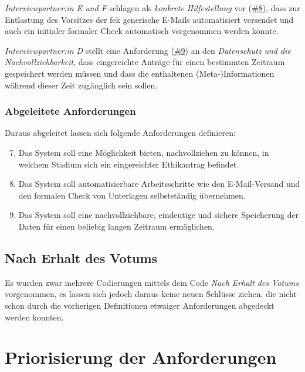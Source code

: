 \documentclass[a4paper,12pt,twoside,numbers=noendperiod]{scrreprt}
\begin{document}
\medskip

\textit{Interviewpartner:in E und F} schlagen als \textit{konkrete Hilfestellung} vor (\hyperref[tab:anforderungen-nach-einreichung]{\#8}), dass zur Entlastung des Vorsitzes der \ac{fek} generische E-Mails automatisiert versendet und auch ein initialer formaler Check automatisch vorgenommen werden könnte.

\medskip

\textit{Interviewpartner:in D} stellt eine Anforderung (\hyperref[tab:anforderungen-nach-einreichung]{\#9}) an den \textit{Datenschutz und die Nachvollziehbarkeit}, dass eingereichte Anträge für einen bestimmten Zeitraum gespeichert werden müssen und dass die enthaltenen (Meta-)Informationen während dieser Zeit zugänglich sein sollen.

\subsubsection*{Abgeleitete Anforderungen}
\label{sub-sub-sec:abgeleitete-anforderungen-nach-einreichung}

Daraus abgeleitet lassen sich folgende Anforderungen definieren:
\begin{enumerate}[label=\textbf{\#\arabic*}]
    \setcounter{enumi}{6}
    \item Das System soll eine Möglichkeit bieten, nachvollziehen zu können, in welchem Stadium sich ein eingereichter Ethikantrag befindet.
    \item Das System soll automatisierbare Arbeitsschritte wie den E-Mail-Versand und den formalen Check von Unterlagen selbstständig übernehmen.
    \item Das System soll eine nachvollziehbare, eindeutige und sichere Speicherung der Daten für einen beliebig langen Zeitraum ermöglichen.
\end{enumerate}

\subsection{Nach Erhalt des Votums}
\label{sub-sec:nach-erhalt-votum}

Es wurden zwar mehrere Codierungen mittels dem Code \textit{Nach Erhalt des Votums} vorgenommen, es lassen sich jedoch daraus keine neuen Schlüsse ziehen, die nicht schon durch die vorherigen Definitionen etwaiger Anforderungen abgedeckt werden konnten.

\section{Priorisierung der Anforderungen}
\label{sec:priorisierung-anforderungen}
\end{document}

